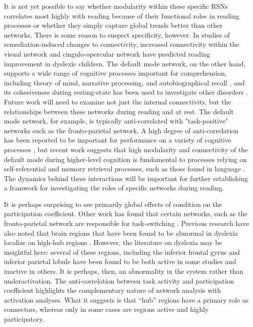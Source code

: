 It is not yet possible to say whether modularity within these specific RSNs correlates most highly with reading because of their functional roles in reading processes or whether they simply capture global trends better than other networks. There is some reason to suspect specificity, however. In studies of remediation-induced changes to connectivity, increased connectivity within the visual network \citep{Koyama2013} and cingulo-opercular network \citep{HorowitzKraus2015} have predicted reading improvement in dyslexic children. The default mode network, on the other hand, supports a wide range of cognitive processes important for comprehension, including theory of mind, narrative processing, and autobiographical recall \citep{Buckner2008, AbdulSabur2014}, and its cohesiveness during resting-state has been used to investigate other disorders \citep{Uddin2008}. Future work will need to examine not just the internal connectivity, but the relationships between these networks during reading and at rest. The default mode network, for example, is typically anti-correlated with "task-positive" networks such as the fronto-parietal network. A high degree of anti-correlation has been reported to be important for performance on a variety of cognitive processes \citep{Fox2005, Keller2015}, but recent work suggests that high modularity and connectivity of the default mode during higher-level cognition is fundamental to processes relying on self-referential and memory retrieval processes, such as those found in language \citep{Vatansever2015}. The dynamics behind these interactions will be important for further establishing a framwork for investigating the roles of specific networks during reading. 

It is perhaps surprising to see primarily global effects of condition on the participation coefficient. Other work has found that certain networks, such as the fronto-parietal network are responsible for task-switching \citep{Cole2013}. Previous research have also noted that brain regions that have been found to be abnormal in dyslexia localize on high-hub regions \citep{Bailey2018}. However, the literature on dyslexia may be insightful here: several of these regions, including the inferior frontal gyrus and inferior parietal lobule have been found to be both active in some studies and inactive in others. It is perhaps, then, an abnormality in the system rather than underactivation. The anti-correlation between task activity and participation coefficient highlights the complementary nature of network analysis with activation analyses. What it suggests is that ``hub'' regions have a primary role as connectors, whereas only in some cases are regions active and highly participatory. 



